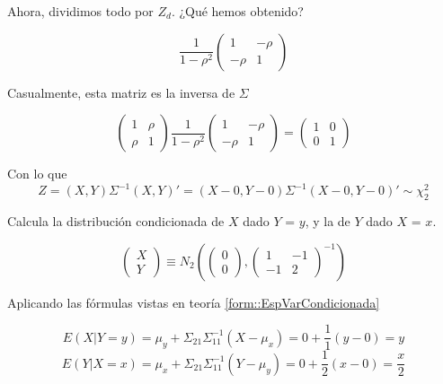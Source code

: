 \begin{problem}[3]
Ahora, dividimos todo por $Z_d$. ¿Qué hemos obtenido?

\[
\frac{1}{1-\rho^2}\begin{pmatrix}1&-\rho\\-\rho&1\end{pmatrix}
\]


Casualmente, esta matriz es la inversa de $Σ$

\[
\begin{pmatrix}1&\rho\\\rho&1\end{pmatrix}\frac{1}{1-\rho^2}\begin{pmatrix}1&-\rho\\-\rho&1\end{pmatrix} = \begin{pmatrix}1&0\\0&1\end{pmatrix}
\]

Con lo que \[Z = (X,Y)Σ^{-1}(X,Y)' = (X-0,Y-0)Σ^{-1}(X-0,Y-0)' \sim \chi^2_2\]

\end{problem}


\begin{problem}[5]

Calcula la distribución condicionada de $X$ dado $Y$ = $y$, y la de $Y$ dado $X$ = $x$.

\solution


\[
\begin{pmatrix}X\\Y \end{pmatrix} \equiv N_2\left(\begin{pmatrix}0\\0\end{pmatrix},\begin{pmatrix}1&-1\\-1&2\end{pmatrix}^{-1}\right)
\]

Aplicando las fórmulas vistas en teoría \ref{form::EspVarCondicionada}

\[
E(X|Y=y) = μ_y + Σ_{21}Σ_{11}^{-1}(X-μ_x) = 0 + \frac{1}{1}(y-0) = y
\]
\[
E(Y|X=x) = μ_x + Σ_{21}Σ_{11}^{-1}(Y-μ_y) = 0 + \frac{1}{2}(x-0) = \frac{x}{2}
\]

\end{problem}

